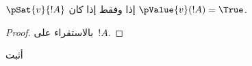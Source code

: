 \documentclass[../../../include/open-logic-section]{subfiles}
\begin{document}
\begin{prop}
  $\pSat{v}{!A}$ إذا وفقط إذا كان $\pValue{v}(!A) = \True$.
\end{prop}

\begin{proof}
  بالاستقراء على~$!A$.
\end{proof}

\begin{prob}
  أثبت 
\end{prob}
\end{document}
